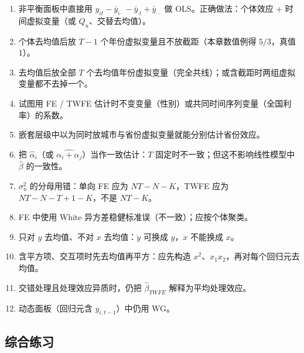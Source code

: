 \begin{enumerate}
  \item 非平衡面板中直接用 $y_{it}-\bar y_{i\cdot}-\bar y_{\cdot t}+\bar y_{\cdot\cdot}$ 做 OLS。正确做法：个体效应 + 时间虚拟变量（或 $Q_u$、交替去均值）。
  \item 个体去均值后放 $T-1$ 个年份虚拟变量且不放截距（本章数值例得 $5/3$，真值 1）。
  \item 去均值后放全部 $T$ 个去均值年份虚拟变量（完全共线）；或含截距时两组虚拟变量都不去掉一个。
  \item 试图用 FE / TWFE 估计时不变变量（性别）或共同时间序列变量（全国利率）的系数。
  \item 嵌套层级中以为同时放城市与省份虚拟变量就能分别估计省份效应。
  \item 把 $\hat\alpha_i$（或 $\widehat{\alpha_i+\alpha_j}$）当作一致估计：$T$ 固定时不一致；但这不影响线性模型中 $\hat\beta$ 的一致性。
  \item $\sigma_u^2$ 的分母用错：单向 FE 应为 $NT-N-K$，TWFE 应为 $NT-N-T+1-K$，不是 $NT-K$。
  \item FE 中使用 White 异方差稳健标准误（不一致）；应按个体聚类。
  \item 只对 $y$ 去均值、不对 $x$ 去均值：$\ddot y$ 可换成 $y$，$\ddot x$ 不能换成 $x$。
  \item 含平方项、交互项时先去均值再平方：应先构造 $x^2$、$x_1x_2$，再对每个回归元去均值。
  \item 交错处理且处理效应异质时，仍把 $\hat\beta_{TWFE}$ 解释为平均处理效应。
  \item 动态面板（回归元含 $y_{i,t-1}$）中仍用 WG。
\end{enumerate}

\subsection{综合练习}

